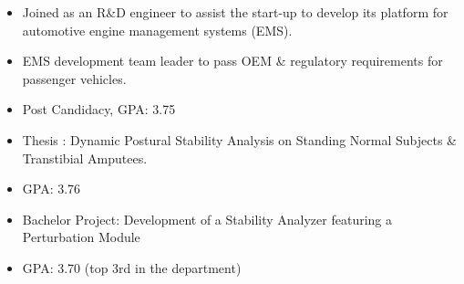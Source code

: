 \documentclass[10pt,letter,ragged2e]{altacv}
\begin{document}
\divider

\begin{itemize}
\item Joined as an R\&D engineer to assist the start-up to develop its platform
for automotive engine management systems (EMS).
\item EMS development team leader to pass OEM \& regulatory requirements for passenger vehicles.
\end{itemize}


\begin{itemize}
\item Post Candidacy, GPA: 3.75
\end{itemize}

\divider

\begin{itemize}
\item Thesis : Dynamic Postural Stability Analysis on Standing Normal Subjects \& Transtibial Amputees.
\item GPA: 3.76
\end{itemize}

\divider

\begin{itemize}
\item Bachelor Project: Development of a Stability Analyzer featuring a
Perturbation Module
\item GPA: 3.70 (top 3rd in the department)
\end{itemize}

\clearpage


\nocite{*}
\end{document}
